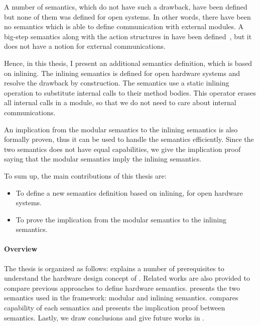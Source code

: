 A number of semantics, which do not have such a drawback, have been
defined but none of them was defined for open systems. In other words,
there have been no semantics which is able to define communication
with external modules. A big-step semantics along with the action
structures in \Bluespec{} have been defined~\cite{nirav-memocode}, but
it does not have a notion for external communications.

Hence, in this thesis, I present an additional semantics definition,
which is based on inlining.  The inlining semantics is defined for
open hardware systems and resolve the drawback by construction.  The
semantics use a static inlining operation to substitute internal calls
to their method bodies. This operator erases all internal calls in a
module, so that we do not need to care about internal communications.

An implication from the modular semantics to the inlining semantics is
also formally proven, thus it can be used to handle the semantics
efficiently. Since the two semantics does not have equal capabilities,
we give the implication proof saying that the modular semantics imply
the inlining semantics.

To sum up, the main contributions of this thesis are:
\begin{itemize}
\item To define a new semantics definition based on inlining, for open
  hardware systems.
\item To prove the implication from the modular semantics to the
  inlining semantics.
\end{itemize}

\paragraph{Overview}

The thesis is organized as follows: 
explains a number of prerequisites to understand the hardware design
concept of \Bluespec{}. Related works are also provided to compare
previous approaches to define hardware
semantics.  presents the two semantics used in
the \Kami{} framework: modular and inlining
semantics.  compares capability of each
semantics and presents the implication proof between
semantics. Lastly, we draw conclusions and give future works in
.





